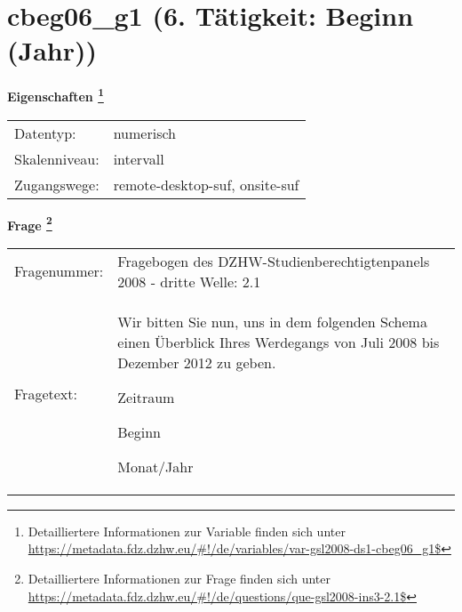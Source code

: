 
    \setcounter{footnote}{0}

    \vspace*{-1.8cm}
	\section{cbeg06\_g1 (6. Tätigkeit: Beginn (Jahr))}
	\label{section:cbeg06_g1}



    \vspace*{0.5cm}
    \noindent\textbf{Eigenschaften
	\footnote{Detailliertere Informationen zur Variable finden sich unter
		\url{https://metadata.fdz.dzhw.eu/\#!/de/variables/var-gsl2008-ds1-cbeg06_g1$}}}\\
	\begin{tabularx}{\hsize}{@{}lX}
	Datentyp: & numerisch \\
	Skalenniveau: & intervall \\
	Zugangswege: &
	  remote-desktop-suf, 
	  onsite-suf
 \\
    \end{tabularx}



				\vspace*{0.5cm}
                \noindent\textbf{Frage
	                \footnote{Detailliertere Informationen zur Frage finden sich unter
		              \url{https://metadata.fdz.dzhw.eu/\#!/de/questions/que-gsl2008-ins3-2.1$}}}\\
				\begin{tabularx}{\hsize}{@{}lX}
					Fragenummer: &
					  Fragebogen des DZHW-Studienberechtigtenpanels 2008 - dritte Welle:
					  2.1
 \\
					Fragetext: & Wir bitten Sie nun, uns in dem folgenden Schema einen Überblick Ihres Werdegangs von Juli 2008 bis Dezember 2012 zu geben.\par  Zeitraum\par  Beginn\par  Monat/Jahr \\
				\end{tabularx}






